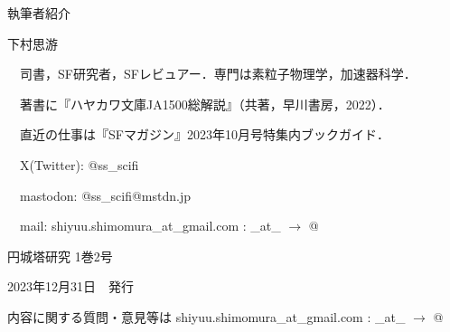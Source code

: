 \documentclass[10pt, a5paper, twoside]{jsarticle}
\theoremstyle{definition}
\begin{document}
	{\large 執筆者紹介}

	\vspace{3mm}

	下村思游

	　司書，SF研究者，SFレビュアー．専門は素粒子物理学，加速器科学．

	　著書に『ハヤカワ文庫JA1500総解説』（共著，早川書房，2022）．

	　直近の仕事は『SFマガジン』2023年10月号特集内ブックガイド．

	　X(Twitter): @ss\_scifi

	　mastodon: @ss\_scifi@mstdn.jp

	　mail: shiyuu.shimomura\_at\_gmail.com : \_at\_ $\rightarrow$ @

	\vfill

	\hrulefill

	\center

	{\Large 円城塔研究 1巻2号}

	2023年12月31日　発行


	\hrulefill

	内容に関する質問・意見等は shiyuu.shimomura\_at\_gmail.com : \_at\_ $\rightarrow$ @
\end{document}
